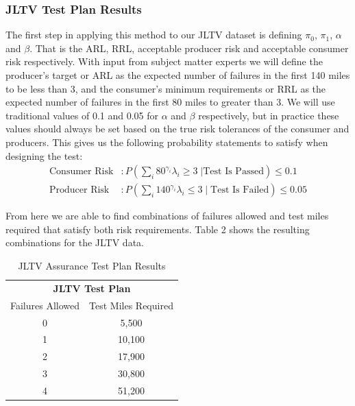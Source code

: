 \documentclass[12pt]{article}
\begin{document}
\subsubsection{JLTV Test Plan Results}
The first step in applying this method to our JLTV dataset is defining $\pi_0$,
$\pi_1$, $\alpha$ and $\beta$.  That is the ARL, RRL, acceptable producer risk
and acceptable consumer risk respectively.  With input from subject matter
experts  we will define the producer's target or ARL as the expected number of
failures in the first 140 miles to be less than 3, and the consumer's minimum
requirements or RRL as the expected number of failures in  the first 80 miles to
greater than 3.  We will use traditional values of 0.1 and 0.05 for $\alpha$ and
$\beta$ respectively, but in practice these values should always be set based on
the true risk tolerances of the consumer and producers.  This gives us the
following probability statements to satisfy when designing the test:
\\
$$
\begin{aligned}
  \text{Consumer Risk} &: P(\sum_i 80^{\gamma_i} \lambda_i \geq 3 \; \vert \text{Test Is Passed}) \leq 0.1  \\
  \text{Producer Risk} &: P(\sum_i 140^{\gamma_i} \lambda_i \leq 3 \; \vert \; \text{Test Is Failed}) \leq 0.05
\end{aligned}
$$

From here we are able to find combinations of failures allowed and test miles
required that satisfy both risk requirements.  Table 2 shows the
resulting combinations for the JLTV data.

\begin{table}[h]
\center
\begin{tabular}{|c|c|}
\multicolumn{2}{c}{\textbf{JLTV Test Plan}} \\
\cline{1-2}
Failures Allowed    & Test Miles Required \\
\hline
0   & 5,500     \\
1   & 10,100    \\
2   & 17,900    \\
3   & 30,800    \\
4   & 51,200    \\
\hline
\end{tabular}
\caption{JLTV Assurance Test Plan Results}
\label{table:ta}
\end{table}
\end{document}
